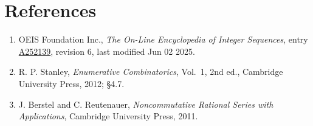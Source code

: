 \documentclass[11pt]{article}
\theoremstyle{definition}
\begin{document}
\section{References}

\begin{enumerate}

\item OEIS Foundation Inc., \emph{The On-Line Encyclopedia of Integer Sequences}, entry \href{https://oeis.org/A252139}{A252139}, revision 6, last modified Jun 02 2025.

\item R. P. Stanley, \emph{Enumerative Combinatorics}, Vol.~1, 2nd ed., Cambridge University Press, 2012; \S4.7.

\item J. Berstel and C. Reutenauer, \emph{Noncommutative Rational Series with Applications}, Cambridge University Press, 2011.

\end{enumerate}
\end{document}
